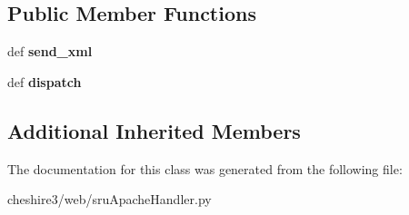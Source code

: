 \subsection*{Public Member Functions}
\begin{DoxyCompactItemize}
\item 
\hypertarget{classcheshire3_1_1web_1_1sru_apache_handler_1_1req_handler_a3d64d07f2a0893c83e6f78f6089df331}{def {\bfseries send\-\_\-xml}}\label{classcheshire3_1_1web_1_1sru_apache_handler_1_1req_handler_a3d64d07f2a0893c83e6f78f6089df331}

\item 
\hypertarget{classcheshire3_1_1web_1_1sru_apache_handler_1_1req_handler_a6e30d6d9da0df6139f7ff515871dad1c}{def {\bfseries dispatch}}\label{classcheshire3_1_1web_1_1sru_apache_handler_1_1req_handler_a6e30d6d9da0df6139f7ff515871dad1c}

\end{DoxyCompactItemize}
\subsection*{Additional Inherited Members}


The documentation for this class was generated from the following file\-:\begin{DoxyCompactItemize}
\item 
cheshire3/web/sru\-Apache\-Handler.\-py\end{DoxyCompactItemize}
